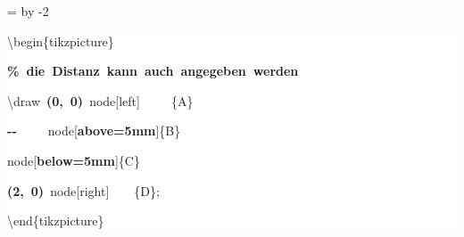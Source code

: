 \begingroup
\ttfamily
{}
=\textwidth
\advance{} by -2\fboxsep
\noindent
\colorbox{background}
{%
\parbox{\dimen255}
{%
\rule[-0.5ex]{0pt}{2.5ex}\hspace*{0.0em}\textbackslash{}begin\{tikzpicture\}\\
\rule[-0.5ex]{0pt}{2.5ex}\hspace*{1.0em}\textcolor{G}{\textbf{\%~die~Distanz~kann~auch~angegeben~werden}}\\
\rule[-0.5ex]{0pt}{2.5ex}\hspace*{1.0em}\textbackslash{}draw~\textcolor{B}{\textbf{(0,~0)}}~node[left]~~~~~\{A\}\\
\rule[-0.5ex]{0pt}{2.5ex}\hspace*{4.0em}\textcolor{B}{\textbf{{-}{-}}}~~~~~node[\textcolor{R}{\textbf{above=5mm}}]\{B\}\\
\rule[-0.5ex]{0pt}{2.5ex}\hspace*{7.5em}node[\textcolor{R}{\textbf{below=5mm}}]\{C\}\\
\rule[-0.5ex]{0pt}{2.5ex}\hspace*{4.0em}\textcolor{B}{\textbf{(2,~0)}}~node[right]~~~~\{D\};\\
\rule[-0.5ex]{0pt}{2.5ex}\hspace*{0.0em}\textbackslash{}end\{tikzpicture\}}%
}%
\endgroup
